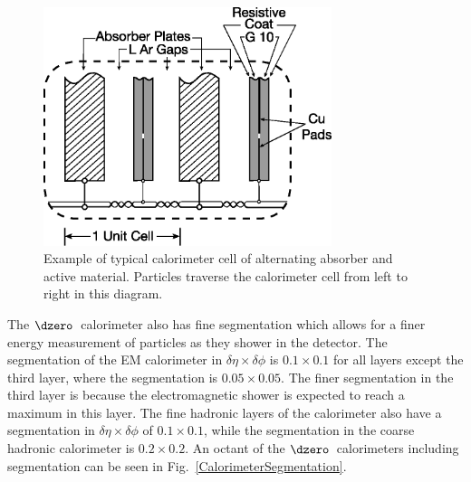 \begin{figure}[!h!tbp]
\begin{center}
\includegraphics[width=0.75\textwidth]{eps/D0/CalorimeterCell.eps}
\end{center}
\vspace{-0.1in}
\caption{Example of typical calorimeter cell of alternating absorber and active material. Particles traverse the calorimeter cell from left to right in this diagram.}
\label{CalorimeterCell}
\end{figure}

The $\dzero$~calorimeter also has fine segmentation which allows for a finer energy measurement of particles as they shower in the detector. The segmentation of the EM calorimeter in $\delta\eta \times \delta\phi$ is $0.1 \times 0.1$ for all layers except the third layer, where the segmentation is $0.05 \times 0.05$. The finer segmentation in the third layer is because the electromagnetic shower is expected to reach a maximum in this layer. The fine hadronic layers of the calorimeter also have a segmentation in $\delta\eta \times \delta\phi$ of $0.1 \times 0.1$, while the segmentation in the coarse hadronic calorimeter is $0.2 \times 0.2$. An octant of the $\dzero$~calorimeters including segmentation can be seen in Fig.~\ref{CalorimeterSegmentation}. 

